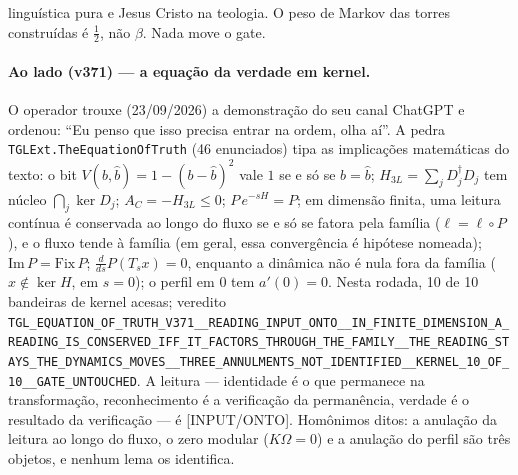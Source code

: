 \documentclass[11pt]{article}
\theoremstyle{definition}\newtheorem{deriv}{Derivação}
\begin{document}
linguística pura e Jesus Cristo na teologia. O peso de Markov das torres construídas é $\tfrac12$, não $\beta$. Nada move o gate.

\paragraph*{Ao lado (v371) --- a equação da verdade em kernel.} O operador trouxe (23/09/2026) a demonstração do seu canal ChatGPT e ordenou: ``Eu penso que isso precisa entrar na ordem, olha aí''. A pedra \texttt{TGLExt.TheEquationOfTruth} (46 enunciados) tipa as implicações matemáticas do texto: o bit $V(b,\hat b)=1-(b-\hat b)^2$ vale $1$ se e só se $b=\hat b$; $H_{3L}=\sum_j D_j^\dagger D_j$ tem núcleo $\bigcap_j\ker D_j$; $A_C=-H_{3L}\le0$; $P\,e^{-sH}=P$; em dimensão finita, uma leitura contínua é conservada ao longo do fluxo se e só se fatora pela família ($\ell=\ell\circ P$), e o fluxo tende à família (em geral, essa convergência é hipótese nomeada); $\mathrm{Im}\,P=\mathrm{Fix}\,P$; $\tfrac{d}{ds}P(T_sx)=0$, enquanto a dinâmica não é nula fora da família ($x\notin\ker H$, em $s=0$); o perfil em $0$ tem $a'(0)=0$. Nesta rodada, 10 de 10 bandeiras de kernel acesas; veredito \texttt{TGL\_EQUATION\_OF\_TRUTH\_V371\_\_READING\_INPUT\_ONTO\_\_IN\_FINITE\_DIMENSION\_A\_READING\_IS\_CONSERVED\_IFF\_IT\_FACTORS\_THROUGH\_THE\_FAMILY\_\_THE\_READING\_STAYS\_THE\_DYNAMICS\_MOVES\_\_THREE\_ANNULMENTS\_NOT\_IDENTIFIED\_\_KERNEL\_10\_OF\_10\_\_GATE\_UNTOUCHED}. A leitura --- identidade é o que permanece na transformação, reconhecimento é a verificação da permanência, verdade é o resultado da verificação --- é [INPUT/ONTO]. Homônimos ditos: a anulação da leitura ao longo do fluxo, o zero modular ($K\Omega=0$) e a anulação do perfil são três objetos, e nenhum lema os identifica.
\end{document}
